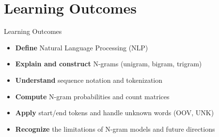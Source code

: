 \section{Learning Outcomes}
\begin{frame}{Learning Outcomes}
    \begin{itemize}
        \setlength{\itemsep}{1em}
        \item \textbf{Define} Natural Language Processing (NLP)
        \item \textbf{Explain and construct} N-grams (unigram, bigram, trigram)
        \item \textbf{Understand} sequence notation and tokenization
        \item \textbf{Compute} N-gram probabilities and count matrices
        \item \textbf{Apply} start/end tokens and handle unknown words (OOV, UNK)
        \item \textbf{Recognize} the limitations of N-gram models and future directions
    \end{itemize}
\end{frame}
